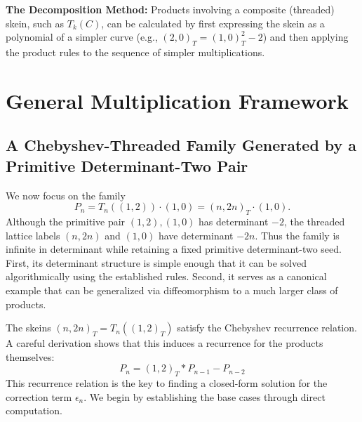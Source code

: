 \documentclass[12pt]{article}
\begin{document}
\textbf{The Decomposition Method:} Products involving a composite (threaded) skein, such as $T_k(C)$, can be calculated by first expressing the skein as a polynomial of a simpler curve (e.g., $(2,0)_T = (1,0)_T^2 - 2$) and then applying the product rules to the sequence of simpler multiplications.

























\section{General Multiplication Framework}
\label{sec:gen-mult}

\subsection{A Chebyshev-Threaded Family Generated by a Primitive Determinant-Two Pair}

We now focus on the family
\[
P_n=T_n((1,2))\cdot(1,0)=(n,2n)_T\cdot(1,0).
\]
Although the primitive pair \((1,2),(1,0)\) has determinant \(-2\), the threaded lattice labels \((n,2n)\) and \((1,0)\) have determinant \(-2n\). Thus the family is infinite in determinant while retaining a fixed primitive determinant-two seed. First, its determinant structure is simple enough that it can be solved algorithmically using the established rules. Second, it serves as a canonical example that can be generalized via diffeomorphism to a much larger class of products.

The skeins $(n, 2n)_T = T_n((1,2)_T)$ satisfy the Chebyshev recurrence relation. A careful derivation shows that this induces a recurrence for the products themselves:
\begin{equation*}
P_n = (1,2)_T \ast P_{n-1} - P_{n-2}
\end{equation*}
This recurrence relation is the key to finding a closed-form solution for the correction term $\epsilon_n$. We begin by establishing the base cases through direct computation.
\end{document}
